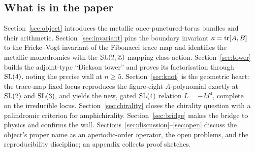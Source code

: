 \subsection{What is in the paper}

Section~\ref{sec:object} introduces the metallic once-punctured-torus bundles and their
arithmetic. Section~\ref{sec:invariant} pins the boundary invariant $\kappa=\operatorname{tr}[A,B]$ to
the Fricke--Vogt invariant of the Fibonacci trace map and identifies the metallic
monodromies with the $\mathrm{SL}(2,\mathbb{Z})$ mapping-class action. Section~\ref{sec:tower} builds
the adjoint-type ``Dickson tower'' and proves its factorisation through $\mathrm{SL}(4)$, noting
the precise wall at $n\ge 5$. Section~\ref{sec:knot} is the geometric heart: the
trace-map fixed locus reproduces the figure-eight $A$-polynomial exactly at $\mathrm{SL}(2)$ and
$\mathrm{SL}(3)$, and yields the new, gated $\mathrm{SL}(4)$ relation $L=-M^4$, complete on the
irreducible locus. Section~\ref{sec:chirality} closes the chirality question with a
palindromic criterion for amphichirality. Section~\ref{sec:bridge} makes the bridge to
physics and confirms the wall. Sections~\ref{sec:discussion}--\ref{sec:open} discuss the
object's proper name as an aperiodic-order operator, the open problems, and the
reproducibility discipline; an appendix collects proof sketches.
